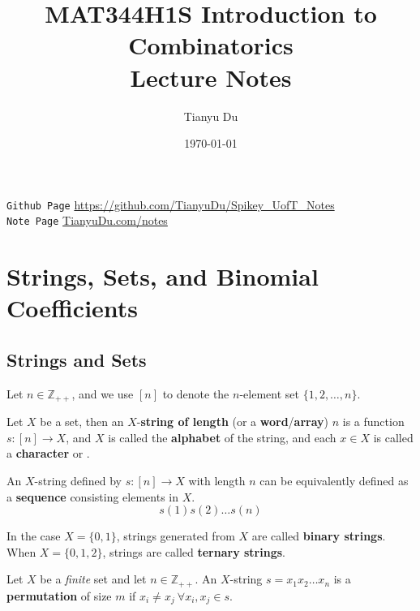 \documentclass{article}
\title{MAT344H1S Introduction to Combinatorics \\Lecture Notes}
\date{\today}
\author{Tianyu Du}
\def\Z{{\mathbb Z}}
\begin{document}
	\maketitle
	\doclicenseThis
	\texttt{Github Page} \url{https://github.com/TianyuDu/Spikey_UofT_Notes}\\
	\texttt{Note Page} \url{TianyuDu.com/notes}
	\tableofcontents
	\newpage
	
	\section{Strings, Sets, and Binomial Coefficients}
		\subsection{Strings and Sets}
			\begin{notation}
				Let $n \in \Z_{++}$, and we use $[n]$ to denote the $n$-element set $\{1,2,\dots,n\}$.
			\end{notation}
			
			\begin{definition}
				Let $X$ be a set, then an $X$-\textbf{string of length} (or a \textbf{word}/\textbf{array}) $n$ is a function $s:[n] \to X$, and $X$ is called the \textbf{alphabet} of the string, and each $x \in X$ is called a \textbf{character} or .
			\end{definition}
			
			\begin{remark}
				An $X$-string defined by $s: [n] \to X$ with length $n$ can be equivalently defined as a \textbf{sequence} consisting elements in $X$.
				\begin{equation}
					s(1)s(2)\dots s(n)
				\end{equation}
			\end{remark}
			
			\begin{definition}
				In the case $X = \{0, 1\}$, strings generated from $X$ are called \textbf{binary strings}. When $X = \{0,1,2\}$, strings are called \textbf{ternary strings}.
			\end{definition}
			
			\begin{definition}
				Let $X$ be a \emph{finite} set and let $n \in \Z_{++}$. An $X$-string $s = x_1 x_2 \dots x_n$ is a \textbf{permutation} of size $m$ if $x_i \neq x_j\ \forall x_i, x_j \in s$.
			\end{definition}
			
\end{document}
